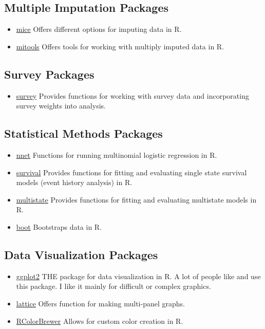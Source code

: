 \documentclass{report}
\begin{document}
    \subsection{Multiple Imputation Packages}
    \begin{itemize}
       \item  \href{https://www.rdocumentation.org/packages/mice/versions/3.6.0/topics/mice|}{mice} Offers different options for imputing data in R.
       \item \href{https://cran.r-project.org/web/packages/mitools/mitools.pdf}{mitools} Offers tools for working with multiply imputed data in R.
       \end{itemize}
       \subsection{Survey Packages}
       \begin{itemize}
      \item \href{https://cran.r-project.org/web/packages/survey/survey.pdf}{survey} Provides functions for working with survey data and incorporating survey weights into analysis.
      \end{itemize}
      \subsection{Statistical Methods Packages}
      \begin{itemize}
      \item \href{https://cran.r-project.org/web/packages/nnet/nnet.pdf}{nnet} Functions for running multinomial logistic regression in R. 
      \item \href{https://cran.r-project.org/web/packages/survival/survival.pdf}{survival} Provides functions for fitting and evaluating single state survival models (event history analysis) in R.
      \item \href{https://cran.r-project.org/web/packages/multistate/multistate.pdf}{multistate} Provides functions for fitting and evaluating multistate models in R.
      \item \href{https://cran.r-project.org/web/packages/boot/boot.pdf}{boot} Bootstraps data in R.
      \end{itemize}
\subsection{Data Visualization Packages}
\begin{itemize}
\item   \href{https://ggplot2.tidyverse.org/}{ggplot2}  THE package for data visualization in R.  A lot of people like and use this package.  I like it mainly for difficult or complex graphics.
\item \href{https://cran.r-project.org/web/packages/lattice/lattice.pdf}{lattice} Offers function for making multi-panel graphs.
\item \href{https://cran.r-project.org/web/packages/RColorBrewer/RColorBrewer.pdf}{RColorBrewer} Allows for custom color creation in R.
    

\end{itemize}
\end{document}
